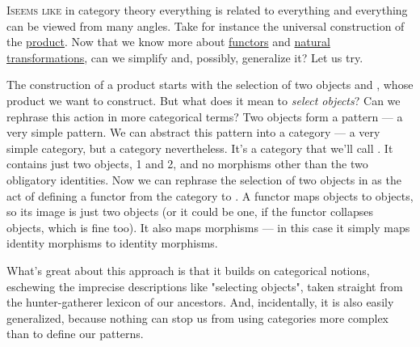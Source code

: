 \lettrine[lhang=0.17]{I}{seems like} in category theory everything is related to everything and
everything can be viewed from many angles. Take for instance the
universal construction of the \hyperref[products-and-coproducts]{product}.
Now that we know more about \hyperref[chap-functors]{functors} and
\hyperref[chap-natural-transformations]{natural transformations}, can we simplify and, possibly, generalize it? Let us
try.

\begin{figure}[H]
\centering
{}
\end{figure}

\noindent
The construction of a product starts with the selection of two objects
 and , whose product we want to construct. But what
does it mean to \emph{select objects}? Can we rephrase this action in
more categorical terms? Two objects form a pattern --- a very simple
pattern. We can abstract this pattern into a category --- a very simple
category, but a category nevertheless. It's a category that we'll call
. It contains just two objects, 1 and 2, and no morphisms
other than the two obligatory identities. Now we can rephrase the
selection of two objects in  as the act of defining a functor 
from the category  to . A functor maps objects to
objects, so its image is just two objects (or it could be one, if the
functor collapses objects, which is fine too). It also maps morphisms
--- in this case it simply maps identity morphisms to identity
morphisms.

\begin{figure}[H]
\centering
{}
\end{figure}

\noindent
What's great about this approach is that it builds on categorical
notions, eschewing the imprecise descriptions like "selecting
objects", taken straight from the hunter-gatherer lexicon of our
ancestors. And, incidentally, it is also easily generalized, because
nothing can stop us from using categories more complex than 
to define our patterns.

